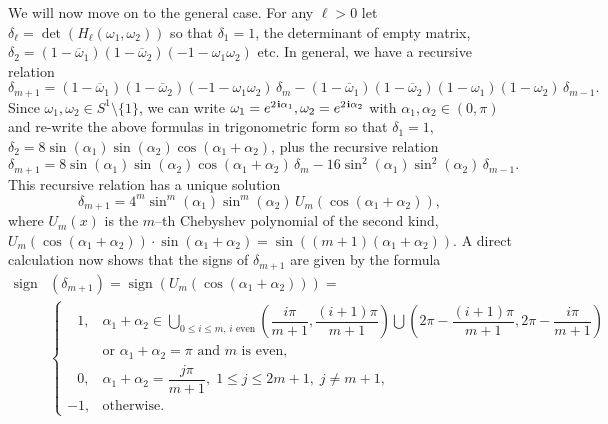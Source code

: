 \documentclass[11pt,reqno]{amsart}
\theoremstyle{definition}
\renewcommand{\i}{\mspace{1.5mu}\mathbf i}
\newcommand{\sign}{\operatorname{sign}}
\begin{document}
\begin{sloppypar}
We will now move on to the general case. For any $\ell > 0$ let $\delta_{\ell} = \det(H_{\ell}(\omega_1, \omega_2))$ so that $\delta_1 = 1$, the determinant of empty matrix, $\delta_2 = (1 - \overline{\omega}_1) (1 - \overline{\omega}_2) (- 1 - \omega_1 \omega_2)$ etc. In general, we have a recursive relation
\[
\delta_{m + 1} = (1 - \overline{\omega}_1) (1 - \overline{\omega}_2) (- 1 - \omega_1\omega_2)\,\delta_{m} - (1 - \overline{\omega}_1) (1 - \overline{\omega}_2) (1 - \omega_1) (1 - \omega_2)\,\delta_{m - 1}.
\]
Since $\omega_1, \omega_2 \in S^1 \setminus \lbrace 1 \rbrace$, we can write $\omega_1 = e^{2 \i \alpha_1}, \omega_2 = e^{2 \i \alpha_2}$ with $\alpha_1, \alpha_2 \in (0, \pi)$ and re-write the above formulas in trigonometric form so that $\delta_1 = 1$, $\delta_2 = 8 \sin(\alpha_1) \sin(\alpha_2) \cos(\alpha_1 + \alpha_2)$, plus the recursive relation
\[
\delta_{m + 1} = 8 \sin(\alpha_1) \sin(\alpha_2) \cos(\alpha_1 + \alpha_2)\, \delta_m - 16 \sin^2(\alpha_1) \sin^2(\alpha_2)\, \delta_{m - 1}.
\]
This recursive relation has a unique solution 
\begin{equation}\label{E:delta}
\delta_{m + 1} = 4^m \sin^m(\alpha_1) \sin^m(\alpha_2)\, U_m(\cos(\alpha_1 + \alpha_2)),
\end{equation}
where $U_m(x)$ is the $m$--th Chebyshev polynomial of the second kind, $U_m (\cos(\alpha_1 + \alpha_2)) \cdot \sin(\alpha_1 + \alpha_2) = \sin ( (m + 1) (\alpha_1 + \alpha_2))$. A direct calculation now shows that the signs of $\delta_{m + 1}$ are given by the formula
\[
\begin{aligned}
 \sign & (\delta_{m + 1})  = \sign(U_m(\cos(\alpha_1 + \alpha_2))) = \\
& \begin{cases}
\;\;\, 1 , & \alpha_1 + \alpha_2 \in \displaystyle\bigcup\limits_{0 \le i \le m, \, i \text{ even}}\left(\dfrac{i \pi}{m + 1}, \dfrac{(i + 1) \pi}{m + 1}\right) \textstyle{\bigcup} \left(2 \pi- \dfrac{(i + 1) \pi}{m + 1}, 2 \pi - \dfrac{i \pi}{m + 1}\right) \\
& \text{or } \alpha_1 + \alpha_2 = \pi \text{ and } m \text{ is even}, \\
\;\;\, 0, & \alpha_1 + \alpha_2 = \dfrac{j \pi}{m + 1},\; 1 \le j \le 2 m + 1,\; j \ne m + 1, \\
- 1, & \text{otherwise. }
\end{cases}
\end{aligned}
\]
			

\end{sloppypar}
\end{document}
